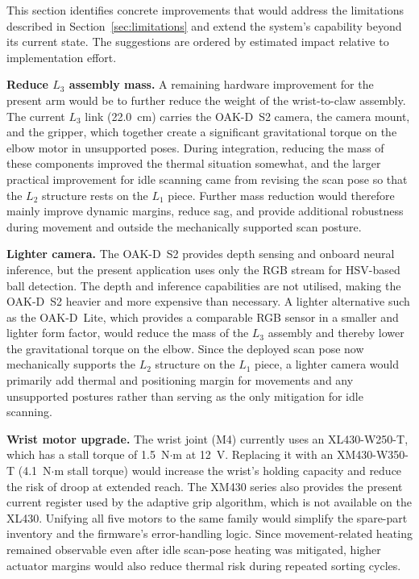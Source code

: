\label{sec:improvements}

This section identifies concrete improvements that would
address the limitations described in Section~\ref{sec:limitations} and extend
the system's capability beyond its current state. The
suggestions are ordered by estimated impact relative to
implementation effort.


\textbf{Reduce $L_3$ assembly mass.} A remaining hardware improvement
for the present arm would be to further reduce the weight of the
wrist-to-claw assembly. The current $L_3$ link
(22.0~cm) carries the OAK-D~S2 camera, the camera mount, and
the gripper, which together create a significant gravitational
torque on the elbow motor in unsupported poses. During integration,
reducing the mass of these components improved the thermal situation
somewhat, and the larger practical improvement for idle scanning came
from revising the scan pose so that the $L_2$ structure rests on the
$L_1$ piece. Further mass reduction would therefore mainly improve
dynamic margins, reduce sag, and provide additional robustness during
movement and outside the mechanically supported scan posture.

\textbf{Lighter camera.} The OAK-D~S2 provides depth sensing
and onboard neural inference, but the present application uses
only the RGB stream for HSV-based ball detection. The depth
and inference capabilities are not utilised, making the
OAK-D~S2 heavier and more expensive than necessary. A lighter
alternative such as the OAK-D~Lite, which provides a
comparable RGB sensor in a smaller and lighter form factor,
would reduce the mass of the $L_3$ assembly and thereby lower
the gravitational torque on the elbow. Since the deployed scan pose now
mechanically supports the $L_2$ structure on the $L_1$ piece, a lighter
camera would primarily add thermal and positioning margin for movements
and any unsupported postures rather than serving as the only mitigation
for idle scanning.

\textbf{Wrist motor upgrade.} The wrist joint (M4) currently
uses an XL430-W250-T, which has a stall torque of 1.5~N$\cdot$m at 12~V.
Replacing it with an XM430-W350-T (4.1~N$\cdot$m stall torque)
would increase the wrist's holding capacity and reduce the risk
of droop at extended reach. The XM430 series also provides the
present current register used by the adaptive grip algorithm,
which is not available on the XL430. Unifying all five motors
to the same family would simplify the spare-part inventory and
the firmware's error-handling logic. Since movement-related heating
remained observable even after idle scan-pose heating was mitigated,
higher actuator margins would also reduce thermal risk during repeated
sorting cycles.

